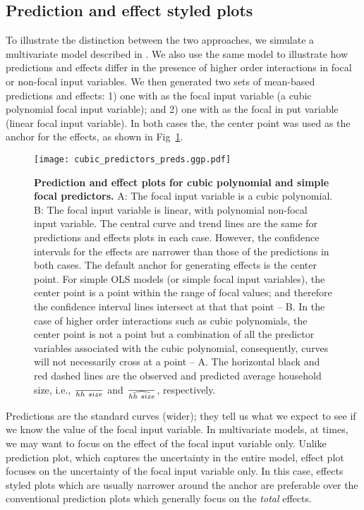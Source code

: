 \subsection{Prediction and effect styled plots}

To illustrate the distinction between the two approaches, we simulate a multivariate model described in . We also use the same model to illustrate how predictions and effects differ in the presence of higher order interactions in focal or non-focal input variables. We then generated two sets of mean-based predictions and effects: 1) one with  as the focal input variable (a cubic polynomial focal input variable); and 2) one with  as the focal in put variable (linear focal input variable). In both cases the, the center point was used as the anchor for the effects, as shown in Fig~\ref{fig:pred_cubic_plots}.

\begin{figure}
\begin{center}
\texttt{[image: cubic\_predictors\_preds.ggp.pdf]}
\end{center}
\caption{{\bf Prediction and effect plots for cubic polynomial and simple focal predictors.} A: The focal input variable is a cubic polynomial. B: The focal input variable is linear, with polynomial non-focal input variable. The central curve and trend lines are the same for predictions and effects plots in each case. However, the confidence intervals for the effects are narrower than those of the predictions in both cases. The default anchor for generating effects is the center point. For simple OLS models (or simple focal input variables), the center point is a point within the range of focal values; and therefore the confidence interval lines intersect at that that point -- B. In the case of higher order interactions such as cubic polynomials, the center point is not a point but a combination of all the predictor variables associated with the cubic polynomial, consequently, curves will not necessarily cross at a point -- A. The horizontal black and red dashed lines are the observed and predicted average household size, i.e., $\over{hh~size}$ and $\over{\widehat{hh~size}}$, respectively.}
\label{fig:pred_cubic_plots}
\end{figure}

Predictions are the standard curves (wider); they tell us what we expect to see if we know the value of the focal input variable. In multivariate models, at times, we may want to focus on the effect of the focal input variable only. Unlike prediction plot, which captures the uncertainty in the entire model, effect plot focuses on the uncertainty of the focal input variable only. In this case, effects styled plots which are usually narrower around the anchor are preferable over the conventional prediction plots which generally focus on the \emph{total} effects. 

